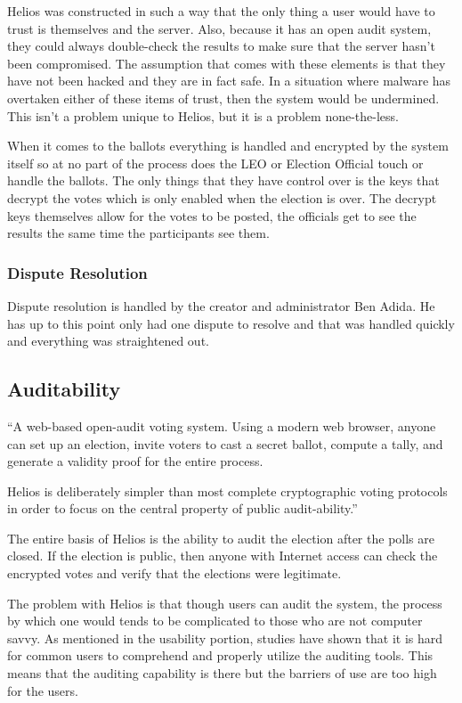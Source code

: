 Helios was constructed in such a way that the only thing a user would
have to trust is themselves and the server. Also, because it has an
open audit system, they could always double-check the results to make
sure that the server hasn't been compromised. The assumption that
comes with these elements is that they have not been hacked and they
are in fact safe. In a situation where malware has overtaken either of
these items of trust, then the system would be undermined. This isn't
a problem unique to Helios, but it is a problem none-the-less.

When it comes to the ballots everything is handled and encrypted by
the system itself so at no part of the process does the LEO or
Election Official touch or handle the ballots. The only things that
they have control over is the keys that decrypt the votes which is
only enabled when the election is over. The decrypt keys themselves
allow for the votes to be posted, the officials get to see the results
the same time the participants see them.

\subsubsection{Dispute Resolution}

Dispute resolution is handled by the creator and administrator Ben
Adida. He has up to this point only had one dispute to resolve and
that was handled quickly and everything was straightened out.

\subsection{Auditability}

``A web-based open-audit voting system. Using a modern web browser,
anyone can set up an election, invite voters to cast a secret ballot,
compute a tally, and generate a validity proof for the entire process.

Helios is deliberately simpler than most complete cryptographic voting
protocols in order to focus on the central property of public
audit-ability.''~\cite{adida2008}

The entire basis of Helios is the ability to audit the election after
the polls are closed. If the election is public, then anyone with
Internet access can check the encrypted votes and verify that the
elections were legitimate.

The problem with Helios is that though users can audit the system, the
process by which one would tends to be complicated to those who are
not computer savvy. As mentioned in the usability portion, studies
have shown that it is hard for common users to comprehend and properly
utilize the auditing tools. This means that the auditing capability is
there but the barriers of use are too high for the users.

